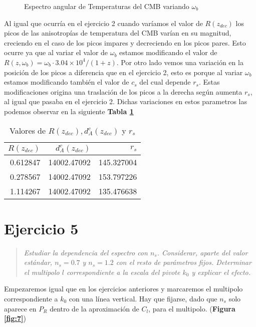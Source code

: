 \documentclass{article}
\begin{document}
\begin{figure}[h]
    \begin{center}
    \end{center}
\caption{\label{fig:6} Espectro angular de Temperaturas del CMB variando $\omega_b$}
\end{figure}

Al igual que ocurría en el ejercicio 2 cuando varíamos el valor de $R(z_{dec})$ los picos de las anisotropías de temperatura del CMB varían en su magnitud, creciendo en el caso de los picos impares y decreciendo en los picos pares. Esto ocurre ya que al variar el valor de $\omega_b$ estamos modificando el valor de $R(z,\omega_b)=\omega_b\cdot 3.04\times 10^4/(1+z)$. Por otro lado vemos una variación en la posición de los picos a diferencia que en el ejercicio 2, esto es porque al variar $\omega_b$ estamos modificando también el valor de $c_s$ del cual depende $r_s$. Estas modificaciones origina una traslación de los picos a la derecha según aumenta $r_s$, al igual que pasaba en el ejercicio 2. Dichas variaciones en estos parametros las podemos observar en la siguiente \textbf{Tabla \ref{tab:3}}

\begin{table}[h]
\centering
\begin{tabular}{rrr}
\toprule
  $R(z_{dec})$ &  $d_A^c(z_{dec})$ & $r_s$ \\
\midrule
      0.612847 &       14002.47092 &  145.327004 \\
      0.278567 &       14002.47092 &  153.797226 \\
      1.114267 &       14002.47092 &  135.476638 \\
\bottomrule
\end{tabular}
\caption{\label{tab:3} Valores de $R(z_{dec}), d_A^c(z_{dec})$ y $r_s$}
\end{table}

\section{Ejercicio 5}
\begin{quote}
\textit{Estudiar la dependencia del espectro con $n_s$. Considerar, aparte del valor estándar, $n_s = 0.7$ y $n_s = 1.2$ con el resto de parámetros fijos. Determinar el multipolo $l$ correspondiente a la escala del pivote $k_0$ y explicar el efecto.}
\end{quote}

Empezaremos igual que en los ejercicios anteriores y marcaremos el multipolo correspondiente a $k_0$ con una línea vertical. Hay que fijarse, dado que $n_s$ solo aparece en $P_R$ dentro de la aproximación de $C_l$, para el multipolo. (\textbf{Figura \ref{fig:7}})
\end{document}
